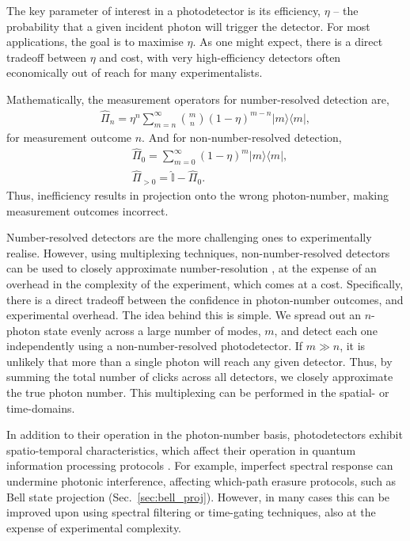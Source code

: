 \documentclass[aps,rmp,twocolumn,amsmath,amssymb,nofootinbib,superscriptaddress,longbibliography,floatfix]{revtex4-1}
\newcommand{\bra}[1]{\langle#1|}
\newcommand{\ket}[1]{|#1\rangle}
\begin{document}
The key parameter of interest in a photodetector is its efficiency, $\eta$ -- the probability that a given incident photon will trigger the detector. For most applications, the goal is to maximise $\eta$. As one might expect, there is a direct tradeoff between $\eta$ and cost, with very high-efficiency detectors often economically out of reach for many experimentalists.

Mathematically, the measurement operators for number-resolved detection are,
\begin{align}
\hat\Pi_n = \eta^{n} \sum_{m=n}^\infty \binom{m}{n} (1-\eta)^{m-n} \ket{m}\bra{m},
\end{align}
for measurement outcome $n$. And for non-number-resolved detection,
\begin{align}
&\hat\Pi_0 = \sum_{m=0}^\infty (1-\eta)^{m} \ket{m}\bra{m}, \nonumber \\
&\hat\Pi_{>0} = \mathbb{\hat{I}} - \hat\Pi_0.
\end{align}
Thus, inefficiency results in projection onto the wrong photon-number, making measurement outcomes incorrect.

Number-resolved detectors are the more challenging ones to experimentally realise. However, using multiplexing techniques, non-number-resolved detectors can be used to closely approximate number-resolution \cite{bib:Banaszek03, bib:RohdeCompDet07, ???}, at the expense of an overhead in the complexity of the experiment, which comes at a cost. Specifically, there is a direct tradeoff between the confidence in photon-number outcomes, and experimental overhead. The idea behind this is simple. We spread out an $n$-photon state evenly across a large number of modes, $m$, and detect each one independently using a non-number-resolved photodetector. If \mbox{$m\gg n$}, it is unlikely that more than a single photon will reach any given detector. Thus, by summing the total number of clicks across all detectors, we closely approximate the true photon number. This multiplexing can be performed in the spatial- or time-domains.

In addition to their operation in the photon-number basis, photodetectors exhibit spatio-temporal characteristics, which affect their operation in quantum information processing protocols \cite{RohdePDReview}. For example, imperfect spectral response can undermine photonic interference, affecting which-path erasure protocols, such as Bell state projection (Sec.~\ref{sec:bell_proj}). However, in many cases this can be improved upon using spectral filtering or time-gating techniques, also at the expense of experimental complexity.
\end{document}
